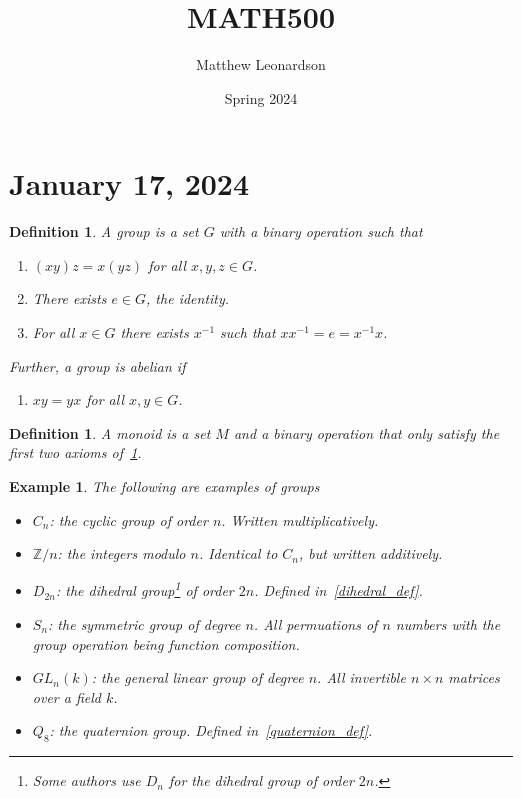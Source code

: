 \documentclass[a4paper,12pt]{article}
\title{MATH500}
\date{Spring 2024}
\author{Matthew Leonardson}
\theoremstyle{sltheorem}
\newtheorem{definition}[theorem]{Definition}
\newtheorem{example}[theorem]{Example}
\begin{document}
\maketitle

\section{January 17, 2024}

\begin{definition}\label{group_def}
    A \textit{group} is a set $G$ with a binary operation such that 
    \begin{enumerate}
        \item $(xy)z = x(yz)$ for all $x, y, z \in G$.
        \item There exists $e \in G$, the identity.
        \item For all $x \in G$ there exists $x^{-1}$ such that $x x^{-1} = e = x^{-1} x$. 
    \end{enumerate}
    Further, a group is \textit{abelian} if \begin{enumerate}[resume]
        \item $xy = yx$ for all $x, y \in G$.
    \end{enumerate}
\end{definition}

\begin{definition}
    A \textit{monoid} is a set $M$ and a binary operation that only satisfy the first two axioms of~\ref{group_def}.
\end{definition}

\begin{example}
    The following are examples of groups
    \begin{itemize}
        \item $C_n$: the cyclic group of order $n$. Written multiplicatively.
        \item $\mathbb{Z}/n$: the integers modulo $n$. Identical to $C_n$, but written additively.
        \item $D_{2n}$: the dihedral group\footnote{Some authors use $D_n$ for the dihedral group of order $2n$.} of order $2n$. Defined in~\ref{dihedral_def}.
        \item $S_n$: the symmetric group of degree $n$. All permuations of $n$ numbers with the group operation being function composition.
        \item $GL_n(k)$: the general linear group of degree $n$. All invertible $n \times n$ matrices over a field $k$.
        \item $Q_8$: the quaternion group. Defined in~\ref{quaternion_def}.
    \end{itemize}

\end{example}
\end{document}
